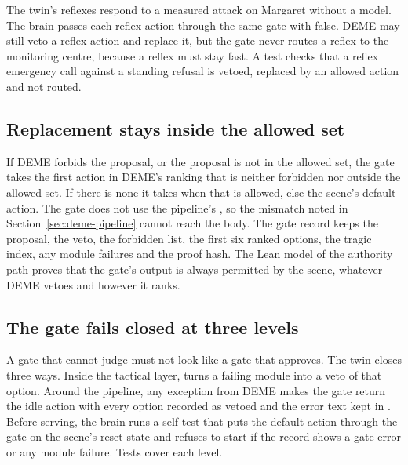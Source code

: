 The twin's reflexes respond to a measured attack on Margaret without a model. The brain passes
each reflex action through the same gate with  false. DEME may still veto a
reflex action and replace it, but the gate never routes a reflex to the monitoring centre,
because a reflex must stay fast. A test checks that a reflex emergency call against a standing
refusal is vetoed, replaced by an allowed action and not routed.

\subsection{Replacement stays inside the allowed set}

If DEME forbids the proposal, or the proposal is not in the allowed set, the gate takes the first
action in DEME's ranking that is neither forbidden nor outside the allowed set. If there is none
it takes  when that is allowed, else the scene's default action. The gate
does not use the pipeline's , so the mismatch noted in
Section~\ref{sec:deme-pipeline} cannot reach the body. The gate record keeps the proposal, the
veto, the forbidden list, the first six ranked options, the tragic index, any module failures
and the proof hash. The Lean model of the authority path proves that the gate's output is always
permitted by the scene, whatever DEME vetoes and however it ranks.

\subsection{The gate fails closed at three levels}

A gate that cannot judge must not look like a gate that approves. The twin closes three ways.
Inside the tactical layer,  turns a failing module into a veto of that option.
Around the pipeline, any exception from DEME makes the gate return the idle action with every
option recorded as vetoed and the error text kept in . Before serving, the
brain runs a self-test that puts the default action through the gate on the scene's reset state
and refuses to start if the record shows a gate error or any module failure. Tests cover each
level.

